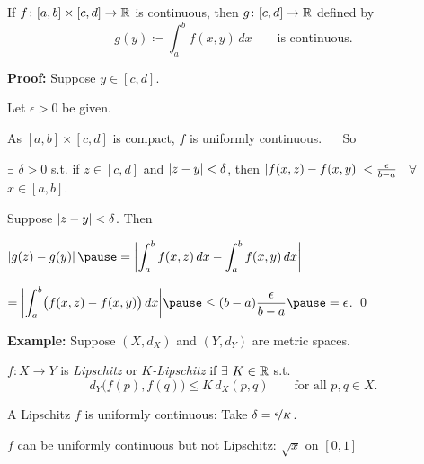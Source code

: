 \documentclass[10pt,aspectratio=169]{beamer}
\begin{document}
\begin{frame}

\begin{proposition}
If $f \colon [a,b] \times [c,d] \to {\mathbb{R}}$ is continuous,
then $g \colon [c,d] \to {\mathbb{R}}$ defined by
\begin{equation*}
g(y) \coloneqq \int_a^b f(x,y) \,dx  \qquad \text{is continuous}.
\end{equation*}
\end{proposition}

\pause
\textbf{Proof:}
Suppose $y \in [c,d]$.

\pause
\medskip

Let $\epsilon > 0$ be given.

\pause
\medskip

As $[a,b] \times [c,d]$ is compact, $f$
is uniformly continuous.
\pause
~~ So

$\exists$ $\delta > 0$ s.t.
if $z \in [c,d]$ and
$\left\lvert {z-y} \right\rvert < \delta$, then
$\left\lvert {f(x,z)-f(x,y)} \right\rvert < \frac{\epsilon}{b-a}$ ~$\forall$ $x \in [a,b]$.

\pause
\medskip

Suppose $\left\lvert {z-y} \right\rvert < \delta$.
\pause
Then

\medskip

$\displaystyle
\abs{
g(z)-
g(y)
}
\pause
=
\bbabs{
\int_a^b 
f(x,z) \,dx 
-
\int_a^b 
f(x,y) \,dx 
}$

\pause
\medskip

\hfill
\hfill
\hfill
$\displaystyle
=
\bbabs{
\int_a^b 
\bigl(
f(x,z) - f(x,y)
\bigr)
\,dx 
}
\pause
\leq
(b-a)
\frac{\epsilon}{b-a}
\pause
= \epsilon$.
\qed

\end{frame}

\begin{frame}

\textbf{Example:}
Suppose $(X,d_X)$ and $(Y,d_Y)$ are metric spaces.

\pause
\medskip


$f \colon X \to Y$ is \emph{Lipschitz} or \emph{$K$-Lipschitz} if $\exists$
$K \in {\mathbb{R}}$ s.t.
\[
d_Y\bigl(f(p),f(q)\bigr) \leq K\, d_X(p,q)
\qquad \text{for all } p,q \in X.
\]

\pause
A Lipschitz $f$ is uniformly continuous:
\pause
Take $\delta = \nicefrac{\epsilon}{K}$.

\pause
\medskip

$f$ can be uniformly continuous but not Lipschitz:
\pause
$\sqrt{x}$ on $[0,1]$

\end{frame}
\end{document}
